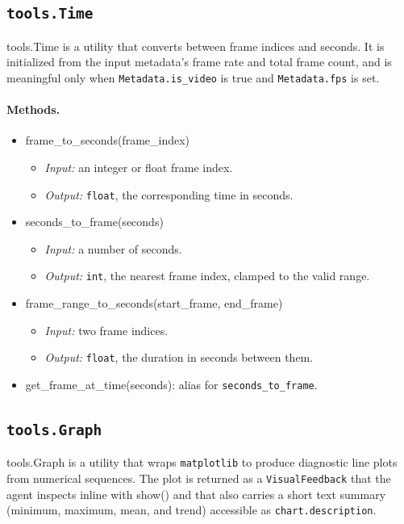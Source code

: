\documentclass{llmxive}
\providecommand{\apicode}[1]{#1}
\begin{document}
\subsection{\texttt{tools.Time}}
\label{app:tool_time}
\apicode{tools.Time} is a utility that converts between frame indices and seconds. It is initialized from the input metadata's frame rate and total frame count, and is meaningful only when \texttt{Metadata.is\_video} is true and \texttt{Metadata.fps} is set.

\paragraph{Methods.}
\begin{itemize}[leftmargin=1.5em]
\item \apicode{frame_to_seconds(frame_index)}
  \begin{itemize}
  \item \emph{Input:} an integer or float frame index.
  \item \emph{Output:} \texttt{float}, the corresponding time in seconds.
  \end{itemize}
\item \apicode{seconds_to_frame(seconds)}
  \begin{itemize}
  \item \emph{Input:} a number of seconds.
  \item \emph{Output:} \texttt{int}, the nearest frame index, clamped to the valid range.
  \end{itemize}
\item \apicode{frame_range_to_seconds(start_frame, end_frame)}
  \begin{itemize}
  \item \emph{Input:} two frame indices.
  \item \emph{Output:} \texttt{float}, the duration in seconds between them.
  \end{itemize}
\item \apicode{get_frame_at_time(seconds)}: alias for \texttt{seconds\_to\_frame}.
\end{itemize}

\subsection{\texttt{tools.Graph}}
\label{app:tool_graph}
\apicode{tools.Graph} is a utility that wraps \texttt{matplotlib} to produce diagnostic line plots from numerical sequences. The plot is returned as a \texttt{VisualFeedback} that the agent inspects inline with \apicode{show()} and that also carries a short text summary (minimum, maximum, mean, and trend) accessible as \texttt{chart.description}.
\end{document}
